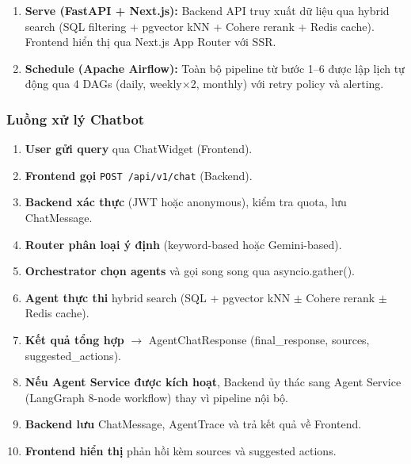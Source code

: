 \begin{enumerate}
    \item \textbf{Serve (FastAPI + Next.js):} Backend API truy xuất dữ liệu qua hybrid search (SQL filtering + pgvector kNN + Cohere rerank + Redis cache). Frontend hiển thị qua Next.js App Router với SSR.

    \item \textbf{Schedule (Apache Airflow):} Toàn bộ pipeline từ bước 1--6 được lập lịch tự động qua 4 DAGs (daily, weekly$\times$2, monthly) với retry policy và alerting.
\end{enumerate}

\subsubsection*{Luồng xử lý Chatbot}

\begin{enumerate}
    \item \textbf{User gửi query} qua ChatWidget (Frontend).
    \item \textbf{Frontend gọi} \texttt{POST /api/v1/chat} (Backend).
    \item \textbf{Backend xác thực} (JWT hoặc anonymous), kiểm tra quota, lưu ChatMessage.
    \item \textbf{Router phân loại ý định} (keyword-based hoặc Gemini-based).
    \item \textbf{Orchestrator chọn agents} và gọi song song qua asyncio.gather().
    \item \textbf{Agent thực thi} hybrid search (SQL + pgvector kNN $\pm$ Cohere rerank $\pm$ Redis cache).
    \item \textbf{Kết quả tổng hợp} $\rightarrow$ AgentChatResponse (final\_response, sources, suggested\_actions).
    \item \textbf{Nếu Agent Service được kích hoạt}, Backend ủy thác sang Agent Service (LangGraph 8-node workflow) thay vì pipeline nội bộ.
    \item \textbf{Backend lưu} ChatMessage, AgentTrace và trả kết quả về Frontend.
    \item \textbf{Frontend hiển thị} phản hồi kèm sources và suggested actions.
\end{enumerate}

\newpage


\vspace{0.3cm}

